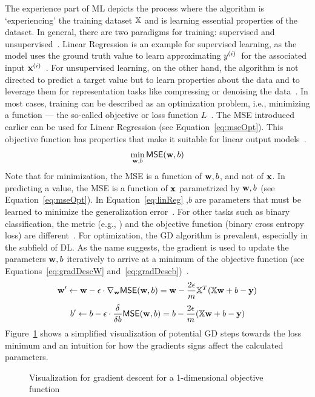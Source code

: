 The experience part of \ac{ML} depicts the process where the algorithm is `experiencing' the training
dataset $\mathbb{X}$ and is learning essential properties of the dataset.
In general, there are two paradigms for training: supervised and
unsupervised~\citep{goodfellow_deep_2016}.
Linear Regression is an example for supervised learning, as the model uses the ground truth value
to learn approximating $y^{(i)}$\ for the associated input
$\textbf{x}^{(i)}$~\citep{alzubi_machine_2018,goodfellow_deep_2016}.
For unsupervised learning, on the other hand, the algorithm is not directed to predict a target
value but to learn properties about the data and to leverage them for representation tasks
like compressing or denoising the data~\citep{goodfellow_deep_2016,geron_hands-machine_2017}.
In most cases, training can be described as an optimization problem, i.e., minimizing a
function --- the so-called objective or loss function $L$~\citep{goodfellow_deep_2016}.
The \ac{MSE} introduced earlier can be used for Linear Regression (see Equation~\ref{eq:mseOpt}).
This objective function has properties that make it suitable for linear output
models~\citep{goodfellow_deep_2016}.
\begin{equation}\label{eq:mseOpt}
    \min_{\textbf{w},b} \textsf{MSE}(\textbf{w},b)
\end{equation}
Note that for minimization, the \ac{MSE} is a function of $\textbf{w},b$, and not of $\textbf{x}$.
In predicting a value, the \ac{MSE} is a function of $\textbf{x}$ parametrized by $\textbf{w},b$ (see
Equation~\ref{eq:mseOpt}).
In Equation~\ref{eq:linReg} \w,$b$ are parameters that must be learned to minimize
the generalization error~\citep{james_introduction_2013,geron_hands-machine_2017}.
For other tasks such as binary classification, the metric (e.g., \fone) and the
objective function (binary cross entropy loss) are different~\citep{geron_hands-machine_2017,
ho_real-world-weight_2020}.
For optimization, the \ac{GD} algorithm is prevalent, especially in the subfield of \ac{DL}.
As the name suggests, the gradient is used to update the parameters $\textbf{w},b$ iteratively  to arrive
at a minimum of the objective function (see Equations~\ref{eq:gradDescW}
and~\ref{eq:gradDescb})~\citep{geron_hands-machine_2017}.
\begin{equation}\label{eq:gradDescW}
    \textbf{w}'\leftarrow \textbf{w}-\epsilon\cdot\nabla_{\textbf{w}} \textsf{MSE}(\textbf{w},b)
        = \textbf{w}-\frac{2\epsilon}{m}\mathbb{X}^T (\mathbb{X}\textbf{w}+b-\textbf{y})
\end{equation}
\begin{equation}\label{eq:gradDescb}
    b'\leftarrow b-\epsilon\cdot\frac{\delta}{\delta b} \textsf{MSE}(\textbf{w},b)
        = b-\frac{2\epsilon}{m}(\mathbb{X}\textbf{w}+b-\textbf{y})
\end{equation}
Figure~\ref{fig:grad-desc} shows a simplified visualization of potential \ac{GD} steps towards the
loss minimum and an intuition for how the gradients signs affect the calculated parameters.
\begin{figure}[hb]
    \centering
    
    \caption[Gradient descent visualization]{%
        Visualization for gradient descent for
        a 1-dimensional objective function~\citep{goodfellow_deep_2016}\label{fig:grad-desc}
    }
\end{figure}

